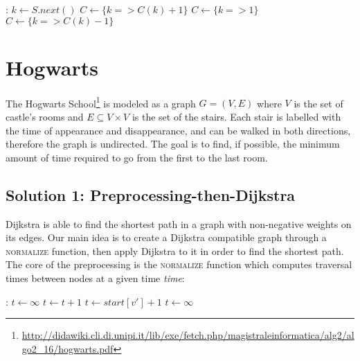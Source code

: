 \documentclass{article}
\begin{document}
\begin{algorithmic}[1]
  :
    \State $k \gets S.next()$\;
        \State $C \gets \{k => C(k) + 1\}$\;    
        \State $C \gets \{k => 1\}$\;           
    \Else
        \State $C \gets \{k => C(k) - 1\}$      
    \EndIf
    \State {}\;
    \EndFunction
\end{algorithmic}


\newpage
\newpage
\section{Hogwarts}

The Hogwarts School\footnote{\url{http://didawiki.cli.di.unipi.it/lib/exe/fetch.php/magistraleinformatica/alg2/algo2_16/hogwarts.pdf}}
is modeled as a graph $G=(V, E)$ where $V$ is the set of castle's rooms and $E \subseteq V \times V$
is the set of the stairs.
Each stair is labelled with the time of appearance and disappearance, and can be
walked in both directions, therefore the graph is undirected.
The goal is to find, if possible, the minimum amount of time required to go from
the first to the last room.

\subsection{Solution 1: Preprocessing-then-Dijkstra}

Dijkstra is able to find the shortest path in a graph with non-negative weights
on its edges.
Our main idea is to create a Dijkstra compatible graph through a \textsc{normalize}
function, then apply Dijkstra to it in order to find the shortest path.
The core of the preprocessing is the \textsc{normalize} function which computes traversal
times between nodes at a given time \emph{time}:

\begin{algorithmic}[1]
  :
    \State $t \gets \infty$
      
      \State $t \gets t + 1$
                
      \State $t \gets start[v'] + 1$
    \Else
      \State $t \gets \infty$          
    \EndIf
      \State {}
    \EndFunction
\end{algorithmic}
\end{document}
